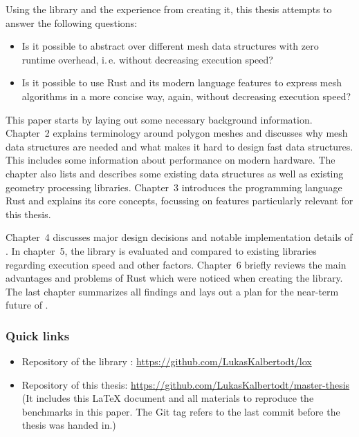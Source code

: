 \newpage

Using the library  and the experience from creating it, this thesis attempts to answer the following questions:

\begin{itemize}
  \item Is it possible to abstract over different mesh data structures with zero runtime overhead, i.\,e. without decreasing execution speed?
  \item Is it possible to use Rust and its modern language features to express mesh algorithms in a more concise way, again, without decreasing execution speed?
\end{itemize}


\vspace{1cm}

This paper starts by laying out some necessary background information.
Chapter~2 explains terminology around polygon meshes and discusses why mesh data structures are needed and what makes it hard to design fast data structures.
This includes some information about performance on modern hardware.
The chapter also lists and describes some existing data structures as well as existing geometry processing libraries.
Chapter~3 introduces the programming language Rust and explains its core concepts, focussing on features particularly relevant for this thesis.

Chapter~4 discusses major design decisions and notable implementation details of .
In chapter~5, the library is evaluated and compared to existing libraries regarding execution speed and other factors.
Chapter~6 briefly reviews the main advantages and problems of Rust which were noticed when creating the library.
The last chapter summarizes all findings and lays out a plan for the near-term future of .


\vfill

\subsubsection*{Quick links}
\begin{itemize}
  \item Repository of the library : \textcolor{link-blue}{\url{https://github.com/LukasKalbertodt/lox}}
  \item Repository of this thesis: \textcolor{link-blue}{\url{https://github.com/LukasKalbertodt/master-thesis}}\\
  {\footnotesize (It includes this \LaTeX{} document and all materials to reproduce the benchmarks in this paper.
  The Git tag  refers to the last commit before the thesis was handed in.)}
\end{itemize}

\vspace{2cm}
